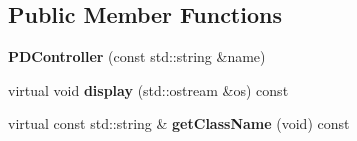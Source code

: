 \subsection*{Public Member Functions}
\begin{DoxyCompactItemize}
\item 
{\bfseries P\+D\+Controller} (const std\+::string \&name)\hypertarget{classdynamicgraph_1_1sot_1_1PDController_a81f0b4f965c6d747d51e425bcf6b1e87}{}\label{classdynamicgraph_1_1sot_1_1PDController_a81f0b4f965c6d747d51e425bcf6b1e87}

\item 
virtual void {\bfseries display} (std\+::ostream \&os) const \hypertarget{classdynamicgraph_1_1sot_1_1PDController_a5d31b7c1fbcfe371d1de29a077687ddb}{}\label{classdynamicgraph_1_1sot_1_1PDController_a5d31b7c1fbcfe371d1de29a077687ddb}

\item 
virtual const std\+::string \& {\bfseries get\+Class\+Name} (void) const \hypertarget{classdynamicgraph_1_1sot_1_1PDController_a6026ca5af993bfa197c1a4b7b7170666}{}\label{classdynamicgraph_1_1sot_1_1PDController_a6026ca5af993bfa197c1a4b7b7170666}

\end{DoxyCompactItemize}
